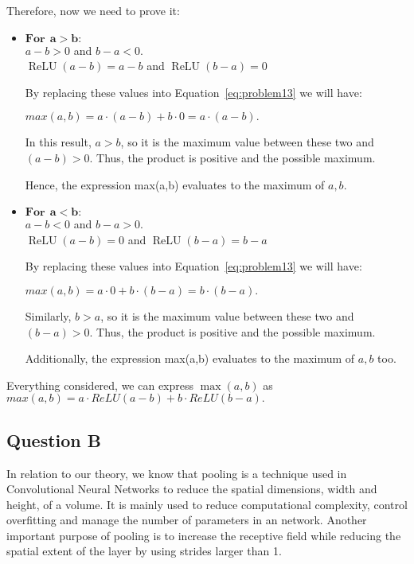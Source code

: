 Therefore, now we need to prove it: 
\begin{itemize}
	\item $\bm{For\ \ a > b:}$\\
	$a - b > 0 $ and $b - a < 0$.\\
	$\operatorname{ReLU}(a - b) = a - b$ and  $\operatorname{ReLU}(b - a) = 0$
	\vspace{1mm}
	
	By replacing these values into Equation~\ref{eq:problem13} we will have:
	
	$max(a,b) = a\cdot(a-b) + b\cdot0 = a\cdot(a-b).$
	\vspace{1mm}
	
	In this result, $a > b$, so it is the maximum value between these two and $(a - b) > 0$. Thus, the product is positive and the possible maximum.
	\vspace{1mm}
	
	Hence, the expression max(a,b) evaluates to the maximum of $a,b$.
	
	\item $\bm{For\ \ a < b:}$\\
	$a - b < 0 $ and $b - a > 0$.\\
	$\operatorname{ReLU}(a - b) = 0$ and  $\operatorname{ReLU}(b - a) = b - a$
	\vspace{1mm}
	
	By replacing these values into Equation~\ref{eq:problem13} we will have:
	
	$max(a,b) = a\cdot0 + b\cdot(b-a) = b\cdot(b-a).$
	\vspace{1mm}
	
	Similarly, $b > a$, so it is the maximum value between these two and $(b - a) > 0$. Thus, the product is positive and the possible maximum.
	\vspace{1mm}
	
	Additionally, the expression max(a,b) evaluates to the maximum of $a,b$ too.
\end{itemize}
Everything considered, we can express $\max(a,b)$ as $	max(a,b) = a \cdot ReLU(a-b) + b \cdot ReLU(b-a).$
\vspace{3mm}

\subsection{Question B}
In relation to our theory, we know that pooling is a technique used in Convolutional Neural Networks to reduce the spatial dimensions, width and height, of a volume. It is mainly used to reduce computational complexity, control overfitting and manage the number of parameters in an network. Another important purpose of pooling is to increase the receptive field while reducing the spatial extent of the layer by using strides larger than 1.\\

